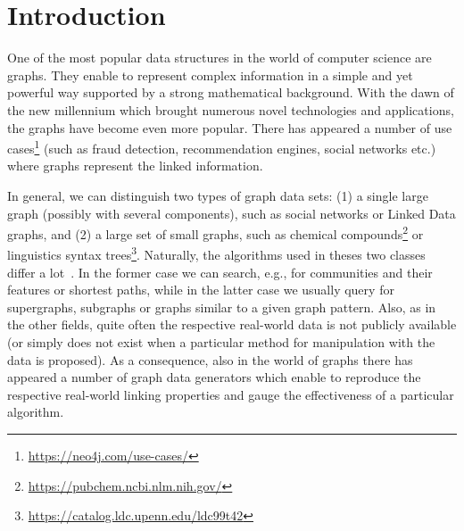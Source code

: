 \section{Introduction}
\label{sec:intro}



One of the most popular data structures in the world of computer science are graphs. They enable to represent complex information in a simple and yet powerful way supported by a strong mathematical background. With the dawn of the new millennium which brought numerous novel technologies and applications, the graphs have become even more popular. There has appeared a number of use cases\footnote{\url{https://neo4j.com/use-cases/}} (such as fraud detection, recommendation engines, social networks etc.) where graphs represent the linked information. 

In general, we can distinguish two types of graph data sets: (1) a single large graph (possibly with several components), such as social networks  or Linked Data graphs, and (2) a large set of small graphs, such as chemical compounds\footnote{\url{https://pubchem.ncbi.nlm.nih.gov/}} or linguistics syntax trees\footnote{\url{https://catalog.ldc.upenn.edu/ldc99t42}}. Naturally, the algorithms used in theses two classes differ a lot~\cite{DBLP:books/igi/Sakr2011}. In the former case we can search, e.g., for communities and their features or shortest paths, while in the latter case we usually query for supergraphs, subgraphs or graphs similar to a given graph pattern. Also, as in the other fields, quite often the respective real-world data is not publicly available (or simply does not exist when a particular method for manipulation with the data is proposed). As a consequence, also in the world of graphs there has appeared a number of graph data generators which enable to  reproduce the respective real-world linking properties and gauge the effectiveness of a particular algorithm.

